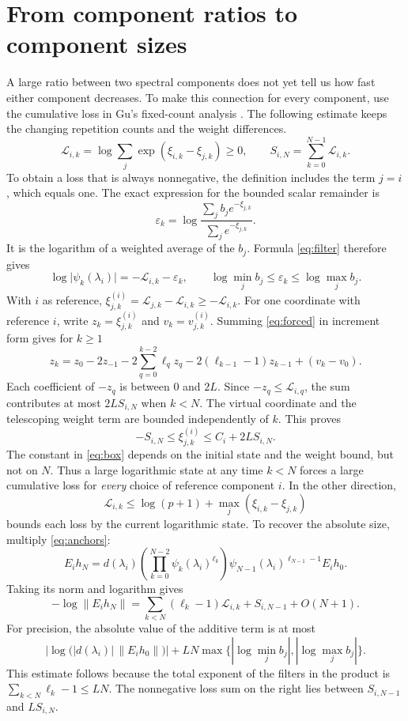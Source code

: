 \documentclass[11pt,a4paper]{article}
\numberwithin{equation}{section}
\newcommand{\norm}[1]{\lVert#1\rVert}
\newcommand{\abs}[1]{\lvert#1\rvert}
\begin{document}
\section{From component ratios to component sizes}\label{sec:loss}
A large ratio between two spectral components does not yet tell us
how fast either component decreases. To make this connection for every component, use the cumulative loss in Gu's fixed-count analysis \cite[Lemma~3.3]{Gu}. The following estimate keeps the changing repetition counts and the weight differences.
\[
 \mathcal L_{i,k}=\log\sum_j\exp(\xi_{i,k}-\xi_{j,k})\ge0,\qquad
 S_{i,N}=\sum_{k=0}^{N-1}\mathcal L_{i,k}.
\]
To obtain a loss that is always nonnegative, the definition includes
the term \(j=i\), which equals one. The exact expression for the
bounded scalar remainder is
\[
 \varepsilon_k=
 \log\frac{\sum_j b_j e^{-\xi_{j,k}}}
              {\sum_j e^{-\xi_{j,k}}}.
\]
It is the logarithm of a weighted average of the \(b_j\).
Formula \eqref{eq:filter} therefore gives
\[
 \log\abs{\psi_k(\lambda_i)}=-\mathcal L_{i,k}-\varepsilon_k,\qquad
 \log\min_j b_j\le\varepsilon_k\le\log\max_j b_j .
\]
With \(i\) as reference, \(\xi^{(i)}_{j,k}=\mathcal L_{j,k}-\mathcal L_{i,k}\ge-\mathcal L_{i,k}\). For one coordinate with reference \(i\), write \(z_k=\xi^{(i)}_{j,k}\) and \(v_k=v^{(i)}_{j,k}\). Summing \eqref{eq:forced} in increment form gives for \(k\ge1\)
\[
 z_k=z_0-2z_{-1}-2\sum_{q=0}^{k-2}\ell_qz_q
       -2(\ell_{k-1}-1)z_{k-1}+(v_k-v_0).
\]
Each coefficient of \(-z_q\) is between \(0\) and \(2L\). Since \(-z_q\le\mathcal L_{i,q}\), the sum contributes at most \(2LS_{i,N}\) when \(k<N\). The virtual coordinate and the telescoping weight term are bounded independently of \(k\). This proves
\begin{equation}\label{eq:box}
 -S_{i,N}\le \xi^{(i)}_{j,k}\le C_i+2L S_{i,N}.
\end{equation}
The constant in \eqref{eq:box} depends on the initial state and
the weight bound, but not on \(N\). Thus a large logarithmic state
at any time \(k<N\) forces a large cumulative loss for \emph{every}
choice of reference component \(i\). In the other direction,
\[
 \mathcal L_{i,k}\le\log(p+1)+\max_j(\xi_{i,k}-\xi_{j,k})
\]
bounds each loss by the current logarithmic state.
To recover the absolute size, multiply \eqref{eq:anchors}:
\[
 E_i h_N=d(\lambda_i)
 \left(\prod_{k=0}^{N-2}\psi_k(\lambda_i)^{\ell_k}\right)
 \psi_{N-1}(\lambda_i)^{\ell_{N-1}-1}E_i h_0 .
\]
Taking its norm and logarithm gives
\begin{equation}\label{eq:radial}
 -\log\norm{E_i h_N}
 = \sum_{k<N}(\ell_k-1)\mathcal L_{i,k}+S_{i,N-1}+O(N+1).
\end{equation}
For precision, the absolute value of the additive term is at
most
\[
 \left|\log\bigl(|d(\lambda_i)|\,\|E_i h_0\|\bigr)\right|
 +LN\max\{|\log\min_j b_j|,|\log\max_j b_j|\}.
\]
This estimate follows because the total exponent of the filters in
the product is \(\sum_{k<N}\ell_k-1\le LN\). The nonnegative loss sum on the right lies between \(S_{i,N-1}\) and \(L S_{i,N}\).
\end{document}
